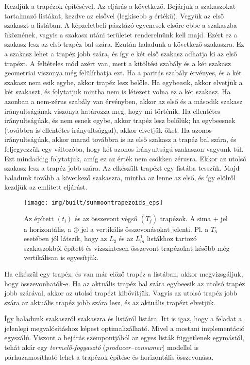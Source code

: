 \documentclass[12pt]{report}
\theoremstyle{definition}
\newcommand{\inenglish}[1]{\textsl{#1}}
\begin{document}
Kezdjük a trapézok építésével. Az eljárás a következő. Bejárjuk a szakaszokat
tartalmazó listákat, kezdve az elsővel (legkisebb $y$ értékű). Vegyük az első
szakaszt a listában. A képzeletbeli pásztázó egyenesek elsőre ebbe a szakaszba
üköznének, vagyis a szakasz utáni területet renderelnünk kell majd. Ezért ez a
szakasz lesz az első trapéz bal szára. Ezután haladunk a következő szakaszra.
Ez a szakasz lehet a trapéz jobb szára, és így e két első szakasz adhatja ki az
első trapézt. A feltételes mód azért van, mert a kitöltési szabály és a két
szakasz geometriai viszonya még felülírhatja ezt. Ha a paritás szabály
érvényes, és a két szakasz nem esik egybe, akkor trapéz lesz belőle. Ha
egybeesik, akkor elvetjük a két szakaszt, és folytatjuk mintha nem is létezett
volna ez a két szakasz. Ha azonban a nem-zérus szabály van érvényben, akkor az
első és a második szakasz irányultságának viszonya határozza meg, hogy mi
történik. Ha ellentétes irányultságúak, és nem esnek egybe, akkor trapéz lesz
belőlük; ha egybeesnek (továbbra is ellentétes irányultsággal), akkor elvetjük
őket. Ha azonos irányultságúak, akkor marad továbbra is az első szakasz a
trapéz bal szára, és feljegyezzük egy változóba, hogy két azonos irányultságú
szakaszon vagyunk túl. Ezt mindaddig folytatjuk, amíg ez az érték nem csökken
zérusra. Ekkor az utolsó szakasz lesz a trapéz jobb szára. Az elkészült trapézt
egy listába tesszük. Majd haladunk tovább a következő szakaszra, mintha az
lenne az első, és így elölről kezdjük az említett eljárást.

  \begin{figure}
    \centering \texttt{[image: img/built/sunmoontrapezoids\_eps]}
    \caption{\label{sunmoontrapezoids} Az épített $(t_i)$ és az összevont végső
    $(T_j)$ trapézok. A sima $+$ jel a horizontális, a $\oplus$ jel a
    vertikális összevonásokat jelenti. Pl. a $T_5$ esetében jól látszik, hogy
    az $L_2$ és az $L_m^1$ listákhoz tartozó szakaszokból épített és
    vízszintesen összevont trapézokat később még vertikálisan is egyesítjük.}
  \end{figure}

Ha elkészül egy trapéz, és van már előző trapéz a listában, akkor
megvizsgáljuk, hogy összevonhatók-e. Ha az aktuális trapéz bal szára egybeesik
az utolsó trapéz jobb szárával, akkor az utolsó trapézt kibővítjük. Vagyis az
utolsó trapéz jobb szára az aktuális trapéz jobb szára lesz, és az aktuális
trapézt elvetjük.

Így haladunk szakaszról szakaszra és listáról listára. Itt is igaz, hogy a
feladat a jelenlegi megvalósításhoz képest optimalizálható. Mivel a mostani
implementáció egyszálú. Viszont a bejárás szempontjából az egyes listák
függetlenek egymástól, tehát akár egy \emph{termelő-fogyasztó}
(\inenglish{producer--consumer}) modellel is párhuzamosítható lehet a trapézok
építése és horizontális összevonása.
\end{document}
